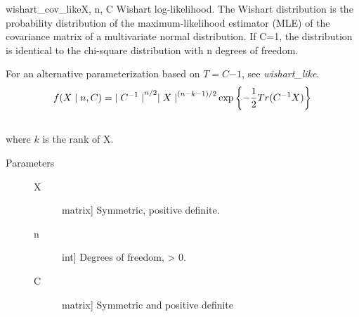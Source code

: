 \hypertarget{pymc.distributions.wishart_cov_like}{}\begin{funcdesc}{wishart\_cov\_like}{X, n, C}
Wishart log-likelihood. The Wishart distribution is the probability
distribution of the maximum-likelihood estimator (MLE) of the covariance
matrix of a multivariate normal distribution. If C=1, the distribution
is identical to the chi-square distribution with n degrees of freedom.

For an alternative parameterization based on $T=C{-1}$, see
\emph{wishart\_like}.
\begin{gather}
\begin{split}f(X \mid n, C) = {\mid C^{-1} \mid}^{n/2}{\mid X \mid}^{(n-k-1)/2} \exp\left\{ -\frac{1}{2} Tr(C^{-1}X) \right\}\end{split}\notag\\\begin{split}\end{split}\notag
\end{gather}
where $k$ is the rank of X.
\begin{description}
\item[Parameters] \leavevmode\begin{description}
\item[X] \leavevmode{[}matrix{]}
Symmetric, positive definite.

\item[n] \leavevmode{[}int{]}
Degrees of freedom, \textgreater{} 0.

\item[C] \leavevmode{[}matrix{]}
Symmetric and positive definite

\end{description}

\end{description}
\end{funcdesc}
\normalsize
